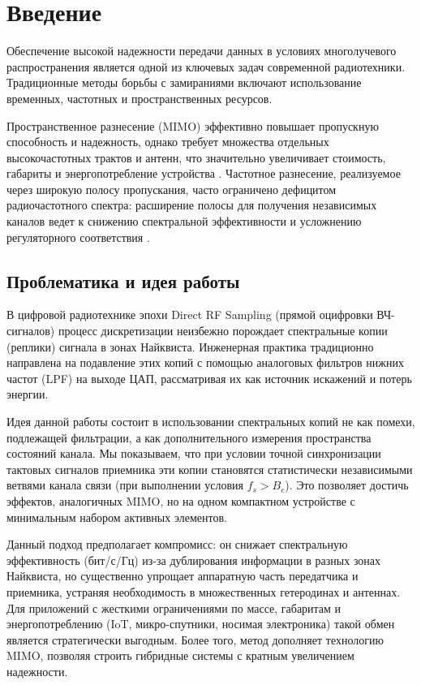 \documentclass[a4paper,12pt]{article}
\numberwithin{equation}{section}
\begin{document}
\section{Введение}

Обеспечение высокой надежности передачи данных в условиях многолучевого распространения является одной из ключевых задач современной радиотехники. Традиционные методы борьбы с замираниями включают использование временных, частотных и пространственных ресурсов. 

Пространственное разнесение (MIMO) эффективно повышает пропускную способность и надежность, однако требует множества отдельных высокочастотных трактов и антенн, что значительно увеличивает стоимость, габариты и энергопотребление устройства \cite{proakis,goldsmith}. Частотное разнесение, реализуемое через широкую полосу пропускания, часто ограничено дефицитом радиочастотного спектра: расширение полосы для получения независимых каналов ведет к снижению спектральной эффективности и усложнению регуляторного соответствия \cite{goldsmith}.

\subsection{Проблематика и идея работы}
В цифровой радиотехнике эпохи Direct RF Sampling (прямой оцифровки ВЧ-сигналов) процесс дискретизации неизбежно порождает спектральные копии (реплики) сигнала в зонах Найквиста. Инженерная практика традиционно направлена на подавление этих копий с помощью аналоговых фильтров нижних частот (LPF) на выходе ЦАП, рассматривая их как источник искажений и потерь энергии.

Идея данной работы состоит в использовании спектральных копий не как помехи, подлежащей фильтрации, а как дополнительного измерения пространства состояний канала. Мы показываем, что при условии точной синхронизации тактовых сигналов приемника эти копии становятся статистически независимыми ветвями канала связи (при выполнении условия $f_s > B_c$). Это позволяет достичь эффектов, аналогичных MIMO, но на одном компактном устройстве с минимальным набором активных элементов.

Данный подход предполагает компромисс: он снижает спектральную эффективность (бит/с/Гц) из-за дублирования информации в разных зонах Найквиста, но существенно упрощает аппаратную часть передатчика и приемника, устраняя необходимость в множественных гетеродинах и антеннах. Для приложений с жесткими ограничениями по массе, габаритам и энергопотреблению (IoT, микро-спутники, носимая электроника) такой обмен является стратегически выгодным. Более того, метод дополняет технологию MIMO, позволяя строить гибридные системы с кратным увеличением надежности.
\end{document}
